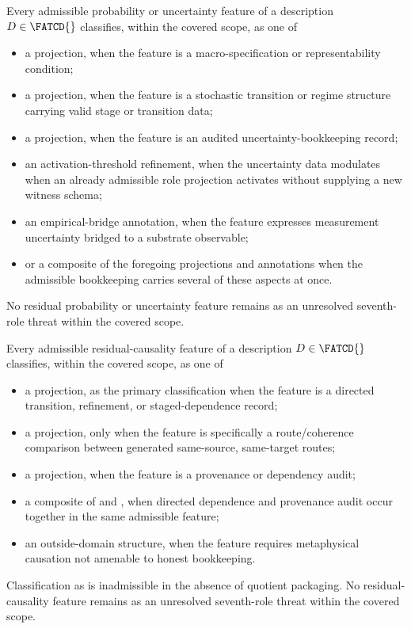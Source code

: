 \begin{proposition}\label{prop:probability-closure}
Every admissible probability or uncertainty feature of a description
\(D \in \FATCD{}\) classifies, within the covered scope, as one of
\begin{itemize}[topsep=2pt,itemsep=1pt]
  \item a \Ptwo{} projection, when the feature is a macro-specification
    or representability condition;
  \item a \Pfour{} projection, when the feature is a stochastic
    transition or regime structure carrying valid stage or transition
    data;
  \item a \Psix{} projection, when the feature is an audited
    uncertainty-bookkeeping record;
  \item an activation-threshold refinement, when the uncertainty data
    modulates when an already admissible role projection activates
    without supplying a new witness schema;
  \item an empirical-bridge annotation, when the feature expresses
    measurement uncertainty bridged to a substrate observable;
  \item or a composite of the foregoing projections and annotations when
    the admissible bookkeeping carries several of these aspects at once.
\end{itemize}
No residual probability or uncertainty feature remains as an unresolved
seventh-role threat within the covered scope.
\end{proposition}

\begin{proposition}\label{prop:causality-closure}
Every admissible residual-causality feature of a description
\(D \in \FATCD{}\) classifies, within the covered scope, as one of
\begin{itemize}[topsep=2pt,itemsep=1pt]
  \item a \Pfour{} projection, as the primary classification when the
    feature is a directed transition, refinement, or staged-dependence
    record;
  \item a \Pthree{} projection, only when the feature is specifically a
    route/coherence comparison between generated same-source,
    same-target routes;
  \item a \Psix{} projection, when the feature is a provenance or
    dependency audit;
  \item a composite of \Pfour{} and \Psix{}, when directed dependence
    and provenance audit occur together in the same admissible feature;
  \item an outside-domain structure, when the feature requires
    metaphysical causation not amenable to honest bookkeeping.
\end{itemize}
Classification as \Pfive{} is inadmissible in the absence of quotient
packaging. No residual-causality feature remains as an unresolved
seventh-role threat within the covered scope.
\end{proposition}

